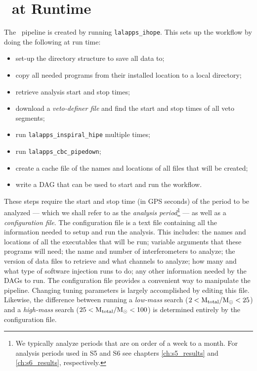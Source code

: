 \section{\ihope~at Runtime}
\label{sec:ihopeRuntime}

The \ihope~pipeline is created by running \texttt{lalapps\_ihope}. This sets up
the workflow by doing the following at run time:

\begin{itemize}
\item{set-up the directory structure to save all data to;}
\item{copy all needed programs from their installed location to a local directory;}
\item{retrieve analysis start and stop times;}
\item{download a {\it veto-definer file} and find the start and stop times of all veto segments;}
\item{run \texttt{lalapps\_inspiral\_hipe} multiple times;}
\item{run \texttt{lalapps\_cbc\_pipedown};}
\item{create a cache file of the names and locations of all files that will be created;}
\item{write a DAG that can be used to start and run the workflow.}
\end{itemize}

These steps require the start and stop time (in GPS seconds) of the period to
be analyzed --- which we shall refer to as the \emph{analysis
period}\footnote{We typically analyze periods that are on order of a week to a
month. For analysis periods used in \ac{S5} and \ac{S6} see chapters
\ref{ch:s5_results} and \ref{ch:s6_results}, respectively.} --- as well as a
\emph{configuration file}. The configuration file is a text file containing all
the information needed to setup and run the analysis. This includes: the names
and locations of all the executables that will be run; variable arguments that
these programs will need; the name and number of interferometers to analyze;
the version of data files to retrieve and what channels to analyze; how many
and what type of software injection runs to do; any other information needed by
the \acp{DAG} to run. The configuration file provides a convenient way to
manipulate the pipeline. Changing tuning parameters is largely accomplished by
editing this file. Likewise, the difference between running a {\it low-mass}
search ($2 < \mathrm{M_{total}}/\mathrm{M_\odot} < 25$) and a {\it high-mass} search ($25 <
\mathrm{M_{total}}/\mathrm{M_\odot} < 100$) is determined entirely by the configuration file.

